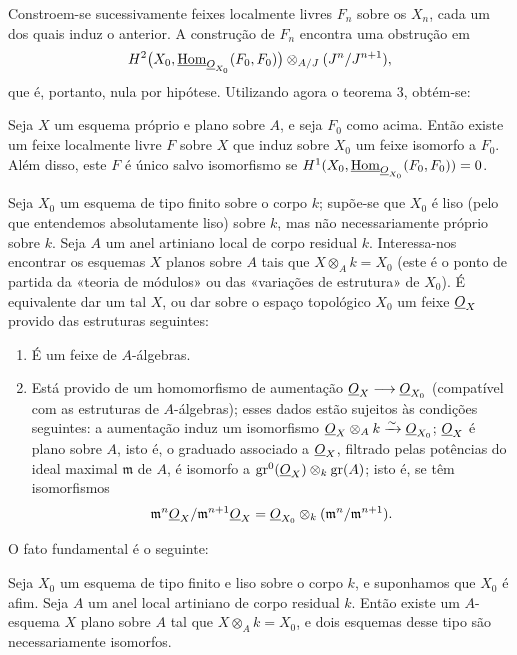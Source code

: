 Constroem-se sucessivamente feixes localmente livres $F_n$ sobre os $X_n$, cada
um dos quais induz o anterior. A construção de $F_n$ encontra uma
obstrução em
\[
  H^2\bigl(X_0,\underline{\operatorname{Hom}}_{\underline{O}_{X_0}}(F_0,F_0)\bigr)
  \otimes_{A/J}(J^n/J^{n+1}),
\]
que é, portanto, nula por hipótese. Utilizando agora o teorema 3, obtém-se:

 Seja $X$ um esquema próprio e plano sobre $A$, e seja $F_0$
como acima. Então existe um feixe localmente livre $F$ sobre $X$ que induz
sobre $X_0$ um feixe isomorfo a $F_0$. Além disso, este $F$ é único salvo
isomorfismo se
$H^1(X_0,\underline{\operatorname{Hom}}_{\underline{O}_{X_0}}(F_0,F_0))=0$.

Seja $X_0$ um esquema de tipo finito sobre o corpo $k$; supõe-se que $X_0$ é
liso (pelo que entendemos absolutamente liso) sobre $k$, mas não
necessariamente próprio sobre $k$. Seja $A$ um anel artiniano local de corpo
residual $k$. Interessa-nos encontrar os esquemas $X$ planos sobre $A$ tais que
$X\otimes_A k=X_0$ (este é o ponto de partida da «teoria de módulos» ou
das «variações de estrutura» de $X_0$). É equivalente dar um tal $X$, ou dar
sobre o espaço topológico $X_0$ um feixe $\underline{O}_X$ provido das estruturas
seguintes:
\begin{enumerate}
  \item[\textit{i.}] É um feixe de $A$-álgebras.
  \item[\textit{ii.}] Está provido de um homomorfismo de aumentação
    $\underline{O}_X\longrightarrow\underline{O}_{X_0}$ (compatível com as estruturas de
    $A$-álgebras); esses dados estão sujeitos às condições seguintes: a
    aumentação induz um isomorfismo
    $\underline{O}_X\otimes_A k\xrightarrow{\sim}\underline{O}_{X_0}$; $\underline{O}_X$ é plano sobre
    $A$, isto é, o graduado associado a $\underline{O}_X$, filtrado pelas potências
    do ideal maximal $\mathfrak m$ de $A$, é isomorfo a
    $\operatorname{gr}^0(\underline{O}_X)\otimes_k\operatorname{gr}(A)$; isto é, se
    têm isomorfismos
    \[
      \mathfrak m^n\underline{O}_X/\mathfrak m^{n+1}\underline{O}_X
      =\underline{O}_{X_0}\otimes_k(\mathfrak m^n/\mathfrak m^{n+1}).
    \]
\end{enumerate}
O fato fundamental é o seguinte:

 Seja $X_0$ um esquema de tipo finito e liso sobre o
corpo $k$, e suponhamos que $X_0$ é afim. Seja $A$ um anel local artiniano de
corpo residual $k$. Então existe um $A$-esquema $X$ plano sobre $A$ tal que
$X\otimes_A k=X_0$, e dois esquemas desse tipo são necessariamente isomorfos.


